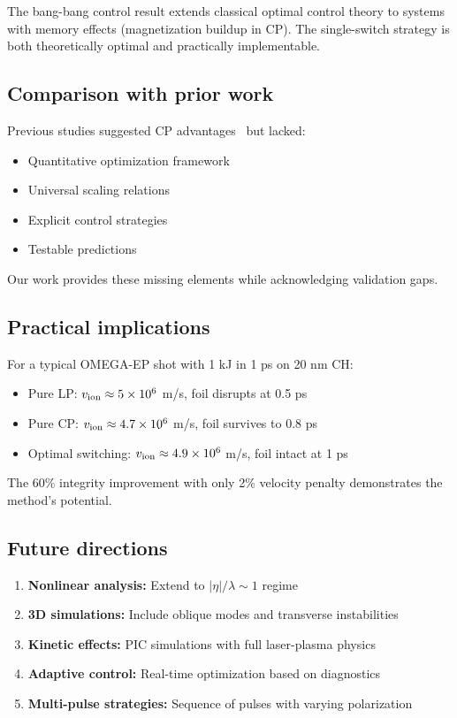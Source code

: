 \documentclass[aps,pre,twocolumn,showpacs,superscriptaddress]{revtex4-2}
\theoremstyle{definition}
\begin{document}
The bang-bang control result extends classical optimal control theory to systems with memory effects (magnetization buildup in CP). The single-switch strategy is both theoretically optimal and practically implementable.

\subsection{Comparison with prior work}

Previous studies suggested CP advantages~\cite{Robinson2009PPCF} but lacked:
\begin{itemize}
\item Quantitative optimization framework
\item Universal scaling relations
\item Explicit control strategies
\item Testable predictions
\end{itemize}

Our work provides these missing elements while acknowledging validation gaps.

\subsection{Practical implications}

For a typical OMEGA-EP shot with 1 kJ in 1 ps on 20 nm CH:
\begin{itemize}
\item Pure LP: $v_{\rm ion} \approx 5 \times 10^6$ m/s, foil disrupts at 0.5 ps
\item Pure CP: $v_{\rm ion} \approx 4.7 \times 10^6$ m/s, foil survives to 0.8 ps
\item Optimal switching: $v_{\rm ion} \approx 4.9 \times 10^6$ m/s, foil intact at 1 ps
\end{itemize}

The 60\% integrity improvement with only 2\% velocity penalty demonstrates the method's potential.

\subsection{Future directions}

\begin{enumerate}
\item \textbf{Nonlinear analysis:} Extend to $|\eta|/\lambda \sim 1$ regime
\item \textbf{3D simulations:} Include oblique modes and transverse instabilities
\item \textbf{Kinetic effects:} PIC simulations with full laser-plasma physics
\item \textbf{Adaptive control:} Real-time optimization based on diagnostics
\item \textbf{Multi-pulse strategies:} Sequence of pulses with varying polarization
\end{enumerate}
\end{document}
